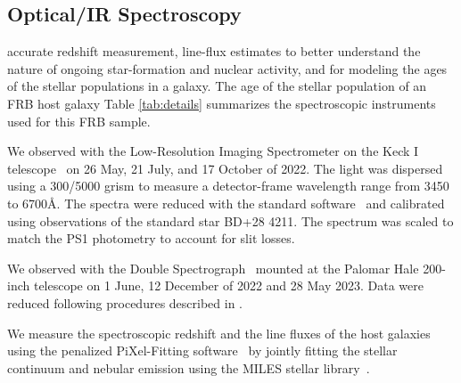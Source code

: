 \subsection{Optical/IR Spectroscopy}

  accurate redshift measurement, line-flux estimates to better understand the nature of ongoing star-formation and nuclear activity, and for modeling the ages of the stellar populations in a galaxy. The age of the stellar population of an FRB host galaxy 
Table \ref{tab:details} summarizes the spectroscopic instruments used for this FRB sample.

We observed with the Low-Resolution Imaging Spectrometer on the Keck I telescope~\citep[Keck-I/LRIS][]{1995PASP..107..375O} on 26 May, 21 July, and 17 October of 2022.  The light was dispersed using a 300/5000 grism to measure a detector-frame wavelength range from 3450 to 6700\AA. The spectra were reduced with the standard  software~\citep{2019PASP..131h4503P} and calibrated using observations of the standard star BD+28 4211. The spectrum was scaled to match the PS1 photometry to account for slit losses. 

We observed with the Double Spectrograph~\citep[DBSP;][]{1982PASP...94..586O} mounted at the Palomar Hale 200-inch telescope on 1 June, 12 December of 2022 and 28 May 2023. Data were reduced following procedures described in \citet{2022MNRAS.513..982R}. 

We measure the spectroscopic redshift and the line fluxes of the host galaxies using the penalized PiXel-Fitting software~\citep[;][]{2017MNRAS.466..798C, 2022arXiv220814974C} by jointly fitting the stellar continuum and nebular emission using the MILES stellar library~\citep{2006MNRAS.371..703S}. 
